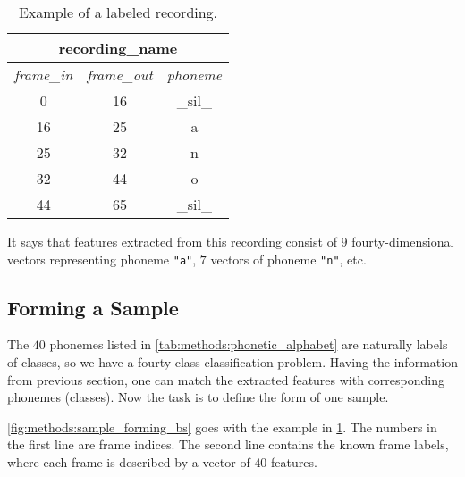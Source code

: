 \begin{table}[H]
\centering
\begin{tabular}{|c|c|c|}
\hline
\multicolumn{3}{|c|}{recording\_name}                                                                                     \\ \hline
\multicolumn{1}{|l|}{\textit{frame\_in}} & \multicolumn{1}{l|}{\textit{frame\_out}} & \multicolumn{1}{l|}{\textit{phoneme}} \\ \hline
0                                       & 16                                      & \_sil\_                               \\ \hline
16                                      & 25                                      & a                                     \\ \hline
25                                      & 32                                      & n                                     \\ \hline
32                                      & 44                                      & o                                     \\ \hline
44                                      & 65                                      & \_sil\_                               \\ \hline
\end{tabular}
\caption{Example of a labeled recording.}
\label{tab:methods:labeling_example}
\end{table}

It says that features extracted from this recording consist of $ 9 $ fourty-dimensional vectors representing phoneme \texttt{"a"}, $ 7 $ vectors of phoneme \texttt{"n"}, etc.

\subsection*{Forming a Sample}
The $ 40 $ phonemes listed in \cref{tab:methods:phonetic_alphabet} are naturally labels of classes, so we have a fourty-class classification problem. Having the information from previous section, one can match the extracted features with corresponding phonemes (classes). Now the task is to define the form of one sample.

\cref{fig:methods:sample_forming_bs} goes with the example in \cref{tab:methods:labeling_example}. The numbers in the first line are frame indices. The second line contains the known frame labels, where each frame is described by a vector of $ 40 $ features.

